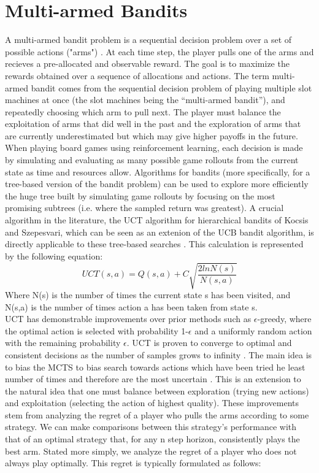 \documentclass[msc, deptreport, ai, romanprepages]{infthesis}
\begin{document}
\section{Multi-armed Bandits}
A multi-armed bandit problem is a sequential decision problem over a set of possible actions ("arms") \cite{robbins1952}. At each time step, the player pulls one of the arms and recieves a pre-allocated and observable reward. The goal is to maximize the rewards obtained over a sequence of allocations and actions. The term multi-armed bandit comes from the sequential decision problem of playing multiple slot machines at once (the slot machines being the “multi-armed bandit”), and repeatedly choosing which arm to pull next. The player must balance the exploitation of arms that did well in the past and the exploration of arms that are currently underestimated but which may give higher payoffs in the future. 
When playing board games using reinforcement learning, each decision is made by simulating and evaluating as many possible game rollouts from the current state as time and resources allow. Algorithms for bandits (more specifically, for a tree-based version of the bandit problem) can be used to explore more efficiently the huge tree built by simulating game rollouts by focusing on the most promising subtrees (i.e. where the sampled return was greatest). A crucial algorithm in the literature, the UCT algorithm for hierarchical bandits of Kocsis and Szepesvari, which can be seen as an extenion of the UCB bandit algorithm, is directly applicable to these tree-based searches \cite{Kocsis2006}. This calculation is represented by the following equation:
\begin{equation}
UCT(s,a) = Q(s,a) + C \sqrt{\frac{2lnN(s)}{N(s,a)}}
\end{equation}
Where N(s) is the number of times the current state s has been visited, and N(s,a) is the number of times action a has been taken from state s. \\
 UCT has demonstrable improvements over prior methods such as \(\epsilon\)-greedy, where the optimal action is selected with probability 1-\(\epsilon\) and a uniformly random action with the remaining probability \(\epsilon\). UCT is proven to converge to optimal and consistent decisions as the number of samples grows to infinity \cite{Kocsis2006}. The main idea is to bias the MCTS to bias search towards actions which have been tried he least number of times and therefore are the most uncertain \cite{Gelly}. This is an extension to the natural idea that one must balance between exploration (trying new actions) and exploitation (selecting the action of highest quality). These improvements stem from analyzing the regret of a player who pulls the arms according to some strategy. We can make comparisons between this strategy's performance with that of an optimal strategy that, for any n step horizon, consistently plays the best arm. Stated more simply, we analyze the regret of a player who does not always play optimally. This regret is typically formulated as follows:
\end{document}
